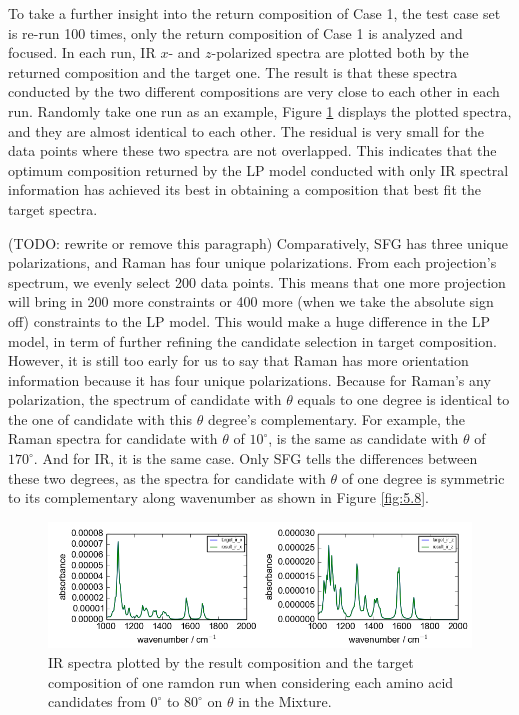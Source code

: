 To take a further insight into the return composition of Case 1, the test case set is re-run 100 times, only the return composition of Case 1 is analyzed and focused. In each run, IR $x$- and $z$-polarized spectra are plotted both by the returned composition and the target one. The result is that these spectra conducted by the two different compositions are very close to each other in each run. Randomly take one run as an example, Figure \ref{fig:5.2} displays the plotted spectra, and they are almost identical to each other. The residual is very small for the data points where these two spectra are not overlapped. This indicates that the optimum composition returned by the LP model conducted with only IR spectral information has achieved its best in obtaining a composition that best fit the target spectra. 

(TODO: rewrite or remove this paragraph) Comparatively, SFG has three unique polarizations, and Raman has four unique polarizations. From each projection's spectrum, we evenly select 200 data points. This means that one more projection will bring in 200 more constraints or 400 more (when we take the absolute sign off) constraints to the LP model. This would make a huge difference in the LP model, in term of further refining the candidate selection in target composition. However, it is still too early for us to say that Raman has more orientation information because it has four unique polarizations. Because for Raman's any polarization, the spectrum of candidate with $\theta$ equals to one degree is identical to the one of candidate with this $\theta$ degree's complementary. For example, the Raman spectra for candidate with $\theta$ of $10^{\circ}$, is the same as candidate with $\theta$ of $170^{\circ}$. And for IR, it is the same case. Only SFG tells the differences between these two degrees, as the spectra for candidate with $\theta$ of one degree is symmetric to its complementary along wavenumber as shown in Figure \ref{fig:5.8}. \\

\begin{figure}[!ht] 
\centering
\includegraphics[scale=0.7]{Figures/chapter5_result_target_residual_plotting__ir_result8_run1.png}
\caption{IR spectra plotted by the result composition and the target composition of one ramdon run when considering each amino acid candidates from $0^{\circ}$ to $80^{\circ}$ on $\theta$ in the Mixture.} \label{fig:5.2}
\end{figure}

